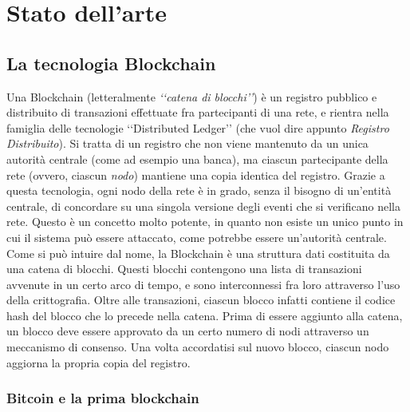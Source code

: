\chapter{Stato dell'arte}
\lhead[\fancyplain{}{\bfseries\thepage}]{\fancyplain{}{\bfseries\rightmark}}
\section{La tecnologia Blockchain}
Una Blockchain (letteralmente \textit{‘‘catena di blocchi’’}) è un registro pubblico e distribuito di transazioni effettuate fra partecipanti di una rete, e rientra nella famiglia delle tecnologie ‘‘Distributed Ledger’’ (che vuol dire appunto \textit{Registro Distribuito}). Si tratta di un registro che non viene mantenuto da un unica autorità centrale (come ad esempio una banca), ma ciascun partecipante della rete (ovvero, ciascun \textit{nodo}) mantiene una copia identica del registro. Grazie a questa tecnologia, ogni nodo della rete è in grado, senza il bisogno di un'entità centrale, di concordare su una singola versione degli eventi che si verificano nella rete. Questo è un concetto molto potente, in quanto non esiste un unico punto in cui il sistema può essere attaccato, come potrebbe essere un'autorità centrale. 
Come si può intuire dal nome, la Blockchain è una struttura dati costituita da una catena di blocchi. Questi blocchi contengono una lista di transazioni avvenute in un certo arco di tempo, e sono interconnessi fra loro attraverso l'uso della crittografia. Oltre alle transazioni, ciascun blocco infatti contiene il codice hash del blocco che lo precede nella catena. Prima di essere aggiunto alla catena, un blocco deve essere approvato da un certo numero di nodi attraverso un meccanismo di consenso. Una volta accordatisi sul nuovo blocco, ciascun nodo aggiorna la propria copia del registro.

\subsection{Bitcoin e la prima blockchain}

